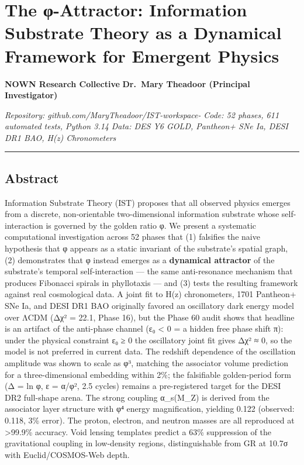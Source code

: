 \documentclass[
]{article}
\author{}
\date{}
\begin{document}
{
\setcounter{tocdepth}{3}
\tableofcontents
}
\section{The φ-Attractor: Information Substrate Theory as a Dynamical
Framework for Emergent
Physics}\label{the-ux3c6-attractor-information-substrate-theory-as-a-dynamical-framework-for-emergent-physics}

\textbf{NOWN Research Collective} \textbf{Dr.~Mary Theadoor (Principal
Investigator)}

\emph{Repository: github.com/MaryTheadoor/IST-workspace-} \emph{Code: 52
phases, 611 automated tests, Python 3.14} \emph{Data: DES Y6 GOLD,
Pantheon+ SNe Ia, DESI DR1 BAO, H(z) Chronometers}

\begin{center}\rule{0.5\linewidth}{0.5pt}\end{center}

\subsection{Abstract}\label{abstract}

Information Substrate Theory (IST) proposes that all observed physics
emerges from a discrete, non-orientable two-dimensional information
substrate whose self-interaction is governed by the golden ratio φ. We
present a systematic computational investigation across 52 phases that
(1) falsifies the naive hypothesis that φ appears as a static invariant
of the substrate's spatial graph, (2) demonstrates that φ instead
emerges as a \textbf{dynamical attractor} of the substrate's temporal
self-interaction --- the same anti-resonance mechanism that produces
Fibonacci spirals in phyllotaxis --- and (3) tests the resulting
framework against real cosmological data. A joint fit to H(z)
chronometers, 1701 Pantheon+ SNe Ia, and DESI DR1 BAO originally favored
an oscillatory dark energy model over ΛCDM (Δχ² = 22.1, Phase 16), but
the Phase 60 audit shows that headline is an artifact of the anti-phase
channel (ε₀ \textless{} 0 = a hidden free phase shift π): under the
physical constraint ε₀ ≥ 0 the oscillatory joint fit gives Δχ² ≈ 0, so
the model is not preferred in current data. The redshift dependence of
the oscillation amplitude was shown to scale as φ³, matching the
associator volume prediction for a three-dimensional embedding within
2\%; the falsifiable golden-period form (Δ = ln φ, ε = α/φ², 2.5 cycles)
remains a pre-registered target for the DESI DR2 full-shape arena. The
strong coupling α\_s(M\_Z) is derived from the associator layer
structure with φ⁴ energy magnification, yielding 0.122 (observed: 0.118,
3\% error). The proton, electron, and neutron masses are all reproduced
at \textgreater99.9\% accuracy. Void lensing templates predict a 63\%
suppression of the gravitational coupling in low-density regions,
distinguishable from GR at 10.7σ with Euclid/COSMOS-Web depth.
\end{document}
